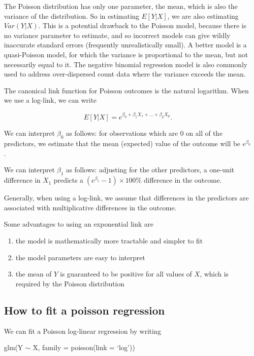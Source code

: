 \documentclass[
  letterpaper,
  DIV=11,
  numbers=noendperiod]{scrreprt}
\begin{document}
The Poisson distribution has only one parameter, the mean, which is also
the variance of the distribution. So in estimating \(E[Y|X]\), we are
also estimating \(Var(Y|X)\). This is a potential drawback to the
Poisson model, because there is no variance parameter to estimate, and
so incorrect models can give wildly inaccurate standard errors
(frequently unrealistically small). A better model is a quasi-Poisson
model, for which the variance is proportional to the mean, but not
necessarily equal to it. The negative binomial regression model is also
commonly used to address over-dispersed count data where the variance
exceeds the mean.

The canonical link function for Poisson outcomes is the natural
logarithm. When we use a log-link, we can write

\[E[Y|X] = e^{\beta_0 + \beta_1X_1 + ... + \beta_pX_p}.\]

We can interpret \(\beta_0\) as follows: for observations which are 0 on
all of the predictors, we estimate that the mean (expected) value of the
outcome will be \(e^{\beta_0}\).

We can interpret \(\beta_1\) as follows: adjusting for the other
predictors, a one-unit difference in \(X_1\) predicts a
\((e^{\beta_1}-1)\times100 \%\) difference in the outcome.

Generally, when using a log-link, we assume that differences in the
predictors are associated with multiplicative differences in the
outcome.

Some advantages to using an exponential link are

\begin{enumerate}
\def\labelenumi{\arabic{enumi}.}
\item
  the model is mathematically more tractable and simpler to fit
\item
  the model parameters are easy to interpret
\item
  the mean of \(Y\) is guaranteed to be positive for all values of
  \(X\), which is required by the Poisson distribution
\end{enumerate}

\subsection{How to fit a poisson
regression}\label{how-to-fit-a-poisson-regression}

We can fit a Poisson log-linear regression by writing

glm(Y \(\sim\) X, family = poisson(link = `log'))
\end{document}
